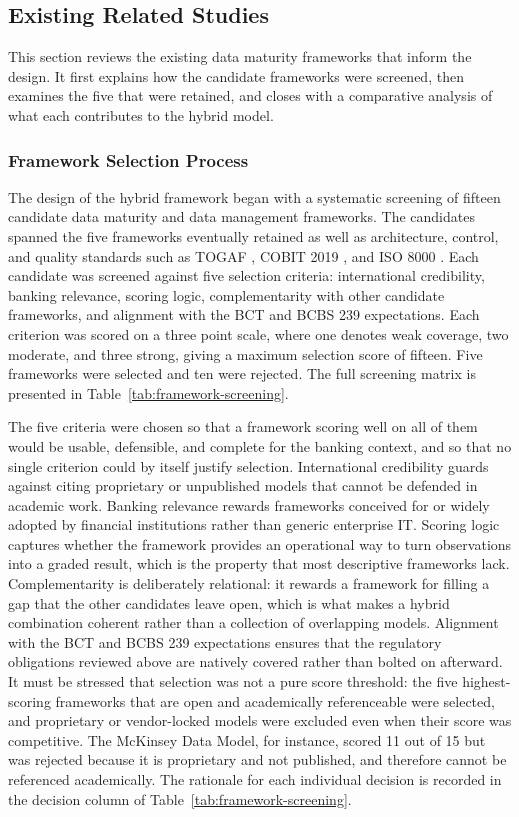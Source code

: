 \subsection{Existing Related Studies}

This section reviews the existing data maturity frameworks that inform the design. It first explains how the candidate frameworks were screened, then examines the five that were retained, and closes with a comparative analysis of what each contributes to the hybrid model.

\subsubsection{Framework Selection Process}

The design of the hybrid framework began with a systematic screening of fifteen candidate data maturity and data management frameworks. The candidates spanned the five frameworks eventually retained as well as architecture, control, and quality standards such as TOGAF \cite{togaf}, COBIT 2019 \cite{cobit2019}, and ISO 8000 \cite{iso8000}. Each candidate was screened against five selection criteria: international credibility, banking relevance, scoring logic, complementarity with other candidate frameworks, and alignment with the BCT and BCBS 239 expectations. Each criterion was scored on a three point scale, where one denotes weak coverage, two moderate, and three strong, giving a maximum selection score of fifteen. Five frameworks were selected and ten were rejected. The full screening matrix is presented in Table~\ref{tab:framework-screening}.

The five criteria were chosen so that a framework scoring well on all of them would be usable, defensible, and complete for the banking context, and so that no single criterion could by itself justify selection. International credibility guards against citing proprietary or unpublished models that cannot be defended in academic work. Banking relevance rewards frameworks conceived for or widely adopted by financial institutions rather than generic enterprise IT. Scoring logic captures whether the framework provides an operational way to turn observations into a graded result, which is the property that most descriptive frameworks lack. Complementarity is deliberately relational: it rewards a framework for filling a gap that the other candidates leave open, which is what makes a hybrid combination coherent rather than a collection of overlapping models. Alignment with the BCT and BCBS 239 expectations ensures that the regulatory obligations reviewed above are natively covered rather than bolted on afterward. It must be stressed that selection was not a pure score threshold: the five highest-scoring frameworks that are open and academically referenceable were selected, and proprietary or vendor-locked models were excluded even when their score was competitive. The McKinsey Data Model, for instance, scored 11 out of 15 but was rejected because it is proprietary and not published, and therefore cannot be referenced academically. The rationale for each individual decision is recorded in the decision column of Table~\ref{tab:framework-screening}.

